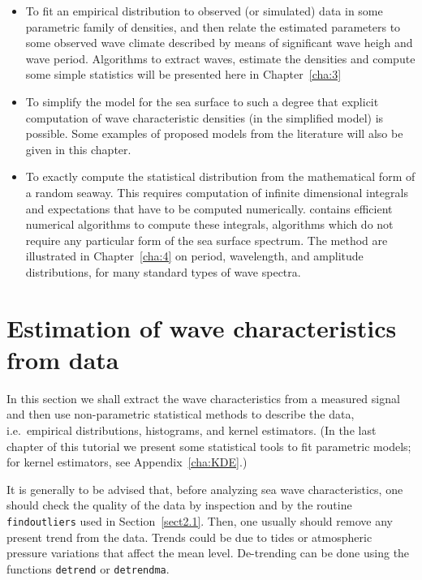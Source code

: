 \begin{itemize}
\item
To fit an empirical distribution to observed (or simulated) data in
some parametric family of densities, and then relate the estimated
parameters to some observed wave climate described by means of
significant wave heigh and wave period. Algorithms to extract
waves, estimate the densities and compute some simple statistics will
be presented here in Chapter~\ref{cha:3}

\item
To simplify the model for the sea surface to such a degree that
explicit computation of wave characteristic densities (in the
simplified model) is possible. Some examples of proposed models from
the literature will also be given in this chapter.

\item
To exactly compute the statistical distribution from the mathematical form of a
random seaway. This requires computation of infinite
dimensional integrals and expectations that have to be
computed numerically. \progname{} contains efficient numerical
algorithms to compute these integrals, algorithms which do not require
any particular form of the sea surface spectrum.
The method are illustrated in Chapter~\ref{cha:4}
on period, wavelength, and amplitude
distributions, for many standard types of wave
spectra.
\end{itemize}

\section{Estimation of wave characteristics from data}
\label{sec:estim-wave-char}

In this section we shall extract the wave characteristics from a
measured signal and then use non-parametric statistical methods
to describe the data, i.e.\ empirical distributions, histograms,
and kernel estimators.
(In the last chapter of this tutorial  we present some statistical
tools to fit parametric models; for kernel estimators, see Appendix~\ref{cha:KDE}.)

It is generally to be advised that, before analyzing sea wave
characteristics, one should check the quality of the data by inspection
and by the routine \verb+findoutliers+ used in Section~\ref{sect2.1}.
Then, one usually should remove any present trend
from the data. Trends could be due to tides or atmospheric pressure
variations that affect the mean level. De-trending can be done using the
\progname{} functions {\tt detrend} or
{\tt detrendma}.

